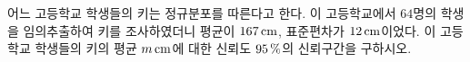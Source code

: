 어느 고등학교 학생들의 키는 정규분포를 따른다고 한다. 이 고등학교에서 $64$명의 학생을 임의추출하여 키를 조사하였더니 평균이 $167\mkern3mu \mathrm{cm}$, 표준편차가 $12\mkern3mu \mathrm{cm}$이었다. 이 고등학교 학생들의 키의 평균 $m\mkern3mu \mathrm{cm}$에 대한 신뢰도 $95\mkern3mu \%$의 신뢰구간을 구하시오. 
